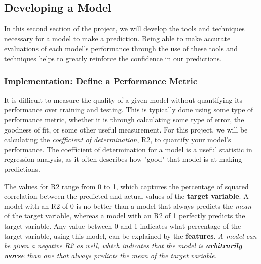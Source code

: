 \documentclass[11pt]{article}
\begin{document}
\subsection{Developing a Model}\label{developing-a-model}

In this second section of the project, we will develop the tools and
techniques necessary for a model to make a prediction. Being able to
make accurate evaluations of each model's performance through the use of
these tools and techniques helps to greatly reinforce the confidence in
our predictions.

    \subsubsection{Implementation: Define a Performance
Metric}\label{implementation-define-a-performance-metric}

It is difficult to measure the quality of a given model without
quantifying its performance over training and testing. This is typically
done using some type of performance metric, whether it is through
calculating some type of error, the goodness of fit, or some other
useful measurement. For this project, we will be calculating the
\href{http://stattrek.com/statistics/dictionary.aspx?definition=coefficient_of_determination}{\emph{coefficient
of determination}}, R2, to quantify your model's performance. The
coefficient of determination for a model is a useful statistic in
regression analysis, as it often describes how "good" that model is at
making predictions.

The values for R2 range from 0 to 1, which captures the percentage of
squared correlation between the predicted and actual values of the
\textbf{target variable}. A model with an R2 of 0 is no better than a
model that always predicts the \emph{mean} of the target variable,
whereas a model with an R2 of 1 perfectly predicts the target variable.
Any value between 0 and 1 indicates what percentage of the target
variable, using this model, can be explained by the \textbf{features}.
\emph{A model can be given a negative R2 as well, which indicates that
the model is \textbf{arbitrarily worse} than one that always predicts
the mean of the target variable.}
\end{document}
